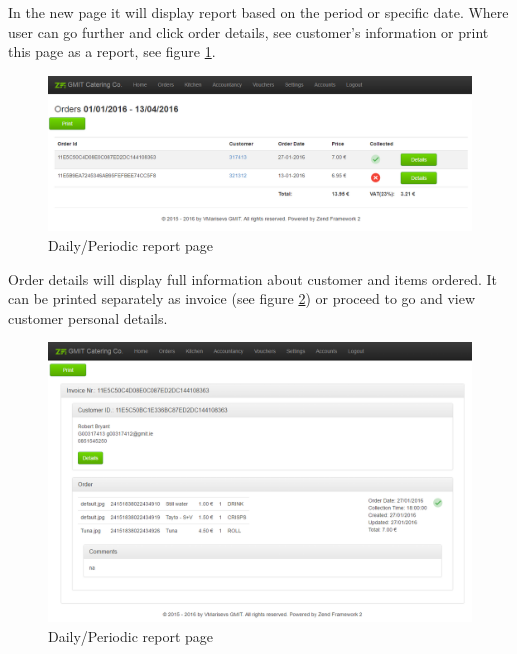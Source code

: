 			In the new page it will display report based on the period or specific date. Where user can go further and click order details, see customer's information or print this page as a report, see figure \ref{fig:daily-report-page}.
			
			\begin{figure}[H]
				\centering
				\includegraphics[width=1\textwidth]{img/zf2/01-canteen_select_periodic_report_page_1.png}
				\caption{Daily/Periodic report page}
				\label{fig:daily-report-page}
			\end{figure}
			
			Order details will display full information about customer and items ordered. It can be printed separately as invoice (see figure \ref{fig:order-invoice-page}) or proceed to go and view customer personal details.
			
			\begin{figure}[H]
				\centering
				\includegraphics[width=1\textwidth]{img/zf2/01-canteen_select_periodic_report_page_2.png}
				\caption{Daily/Periodic report page}
				\label{fig:order-invoice-page}
			\end{figure}
			
			
		
		
		
